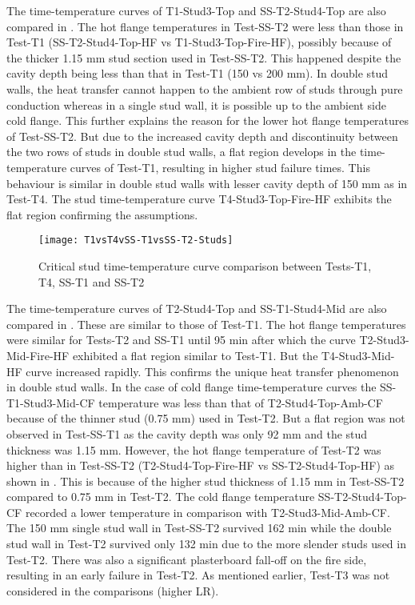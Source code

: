 The time-temperature curves of T1-Stud3-Top and SS-T2-Stud4-Top are also compared in . The hot flange temperatures in Test-SS-T2 were less than those in Test-T1 (SS-T2-Stud4-Top-HF vs T1-Stud3-Top-Fire-HF), possibly because of the thicker 1.15 mm stud section used in Test-SS-T2. This happened despite the cavity depth being less than that in Test-T1 (150 vs 200 mm). In double stud walls, the heat transfer cannot happen to the ambient row of studs through pure conduction whereas in a single stud wall, it is possible up to the ambient side cold flange. This further explains the reason for the lower hot flange temperatures of Test-SS-T2. But due to the increased cavity depth and discontinuity between the two rows of studs in double stud walls, a flat region develops in the time-temperature curves of Test-T1, resulting in higher stud failure times. This behaviour is similar in double stud walls with lesser cavity depth of 150 mm as in Test-T4. The stud time-temperature curve T4-Stud3-Top-Fire-HF exhibits the flat region confirming the assumptions.
\begin{figure}[!htbp]
	\centering
		\texttt{[image: T1vsT4vSS-T1vsSS-T2-Studs]}  
	\caption{Critical stud time-temperature curve comparison between Tests-T1, T4, SS-T1 and SS-T2}
	\label{fig:T1vsT4vSS-T1vsSS-T2-Studs}
\end{figure}

The time-temperature curves of T2-Stud4-Top and SS-T1-Stud4-Mid are also compared in . These are similar to those of Test-T1. The hot flange temperatures were similar for Tests-T2 and SS-T1 until 95 min after which the curve T2-Stud3-Mid-Fire-HF exhibited a flat region similar to Test-T1. But the T4-Stud3-Mid-HF curve increased rapidly. This confirms the unique heat transfer phenomenon in double stud walls. In the case of cold flange time-temperature curves the SS-T1-Stud3-Mid-CF temperature was less than that of T2-Stud4-Top-Amb-CF because of the thinner stud (0.75 mm) used in Test-T2. But a flat region was not observed in Test-SS-T1 as the cavity depth was only 92 mm and the stud thickness was 1.15 mm. However, the hot flange temperature of Test-T2 was higher than in Test-SS-T2 (T2-Stud4-Top-Fire-HF vs SS-T2-Stud4-Top-HF) as shown in . This is because of the higher stud thickness of 1.15 mm in Test-SS-T2 compared to 0.75 mm in Test-T2. The cold flange temperature SS-T2-Stud4-Top-CF recorded a lower temperature in comparison with T2-Stud3-Mid-Amb-CF. The 150 mm single stud wall in Test-SS-T2 survived 162 min while the double stud wall in Test-T2 survived only 132 min due to the more slender studs used in Test-T2. There was also a significant plasterboard fall-off on the fire side, resulting in an early failure in Test-T2. As mentioned earlier, Test-T3 was not considered in the comparisons (higher LR).

